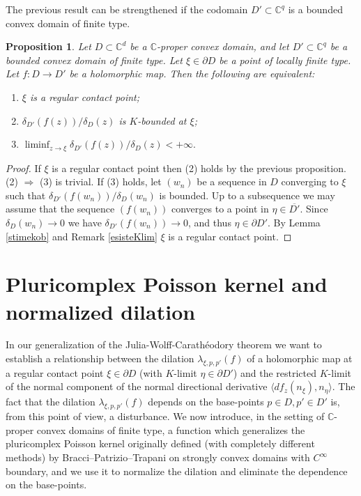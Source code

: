 \documentclass[11pt, reqno]{amsart}
\numberwithin{equation}{section}
\newtheorem{proposition}[theorem]{Proposition}
\theoremstyle{definition}
\newcommand{\C}{\mathbb{C}}
\begin{document}
{{{		The previous result can be strengthened if the codomain $D'\subset\C^{q}$ is a bounded convex domain of finite type.
		\begin{proposition}\label{ratiodeltas+}
			Let $D\subset\C^d$  be a  $\C$-proper convex domain, and let $D'\subset\C^{q}$ be a bounded convex domain of finite type. Let $\xi\in\partial D$ be a
			point of locally finite type. Let $f\colon D\to D'$ be a holomorphic map.
			Then the following are equivalent:
			\begin{enumerate}
				\item $\xi$ is a regular contact point; 
				\item $\delta_{D'}(f(z))/\delta_D(z)$ is $K$-bounded at $\xi$;
				\item $\liminf_{z\to\xi}\delta_{D'}(f(z))/\delta_D(z)<+\infty.$
			\end{enumerate}
		\end{proposition} 
		\begin{proof}
			If $\xi$ is a  regular contact point then (2) holds by the previous proposition. (2) $\Rightarrow$ (3) is trivial.
			If (3)  holds, let $(w_n)$ be a sequence in $D$ converging to $\xi$ such that 
			$\delta_{D'}(f(w_n))/\delta_D(w_n)$ is bounded. Up to a subsequence we may assume that the sequence $(f(w_n))$ converges to a point  in $\eta\in\overline {D'}$. Since $\delta_D(w_n)\to 0$ we have $\delta_{D'}(f(w_n))\to 0$, and thus $\eta\in \partial D'$. By  Lemma \ref{stimekob} and Remark \ref{esisteKlim} $\xi$ is a regular contact point.
		\end{proof}
		
		
		
		
		
		
		
		
		
		
		
		
		
		
		
		
		
		\section{Pluricomplex Poisson kernel and normalized dilation}
		
		In our generalization of the Julia-Wolff-Carath\'eodory theorem we want to establish a relationship between  the dilation $ \lambda_{\xi,p,p'}(f)$ of a holomorphic map at a regular contact point $\xi\in \partial D$ (with $K$-limit $\eta\in \partial D'$) and the restricted $K$-limit of the normal component of the normal directional derivative
		$\langle df_z(n_\xi),n_\eta\rangle$. The fact that the dilation $\lambda_{\xi,p,p'}(f)$ depends on the  base-points $p\in D,p'\in D'$ is, from this point of view, a disturbance. We now introduce, in the setting of  $\C$-proper convex domains of finite type,  a function which generalizes  {the pluricomplex Poisson kernel} originally defined  (with completely different methods) by  Bracci--Patrizio--Trapani \cite{BP,BPT} on strongly convex domains with $C^\infty$ boundary,  and we use it  to normalize the dilation and eliminate the dependence on the base-points.
		
}}}
\end{document}
